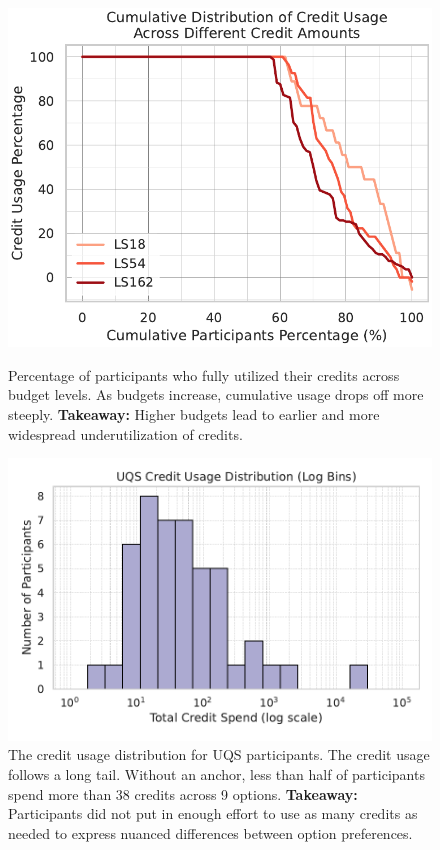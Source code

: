 \begin{figure}[ht]
  \centering

  \begin{minipage}[t]{0.48\textwidth}
    \centering
    \includegraphics[width=\textwidth]{content/image/cumulative_distribution_credit_usage.pdf}
    \caption[]{
    Percentage of participants who fully utilized their credits across budget levels. As budgets increase, cumulative usage drops off more steeply.
    \textbf{Takeaway:} Higher budgets lead to earlier and more widespread underutilization of credits.
    }   
    \label{fig:credit_usage_descending}
  \end{minipage}
  \hfill
  \begin{minipage}[t]{0.48\textwidth}
    \centering
    \includegraphics[width=\textwidth]{content/image/uqs_credit_usage_distribution_logbins.pdf}
    \caption[]{The credit usage distribution for UQS participants. The credit usage follows a long tail. Without an anchor, less than half of participants spend more than 38 credits across 9 options. \textbf{Takeaway:} Participants did not put in enough effort to use as many credits as needed to express nuanced differences between option preferences.}
    \label{fig:uqs_usage}
  \end{minipage}

\end{figure}


